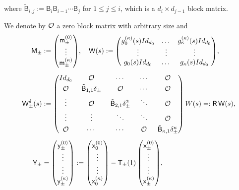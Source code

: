 \documentclass[10pt,a4paper]{amsart}
\theoremstyle{definition}
\newcommand{\sB}{{\mathsf B}}
\newcommand{\sW}{{\mathsf W}}
\newcommand{\I}{\textup{Id}}\let\Id\I
\begin{document}
where $\tilde \sB_{i,j} := \sB_i \sB_{i-1} \cdots \sB_j$ for
$1 \le j \le i$, which is a $d_i \times d_{j-1}$ block matrix.

We denote by ${\mathcal O}$ a zero block matrix with arbitrary size and
\begin{align}\label{eq:matrices}
\mathsf M_\pm &:=
\begin{pmatrix}
\mathsf m^{(0)}_\pm \\
\vdots \\
\mathsf m^{(\kappa)} _\pm
\end{pmatrix}\!, \quad
\sW(s) :=
\begin{pmatrix}
g_0^{(\kappa)}(s) \I_{d_0} & \dots & g_\kappa ^{(\kappa)} (s)
\I_{d_0} \\
\vdots & \vdots & \vdots \\
g_0(s) \I_{d_0} & \dots & g_\kappa(s) \I_{d_0}
\end{pmatrix}\!, \\[5pt]
\sW_\pm ^\delta(s) &:=\arraycolsep6.5pt
\begin{pmatrix}
\I_{d_0} & \OO & \cdots & \cdots & \OO \\[3pt]
\OO & \tilde \sB_{1,1} \delta_{\pm} & \OO & \cdots & \OO \\[3pt]
\vdots & \OO & \tilde\sB_{2,1} \delta_\pm ^2 & \ddots & \OO \\[3pt]
\vdots & \vdots & \ddots & \ddots & \OO \\[3pt]
\OO & \cdots & \cdots & \OO & \tilde \sB_{\kappa,1} \delta_\pm ^\kappa
\end{pmatrix}
W(s) =: \mathsf R \, \mathsf W(s),\\[5pt]
\mathsf Y_\pm &=
\begin{pmatrix}
\mathsf y^{(0)} _\pm \\
\vdots \\
\vdots \\
\mathsf y^{(\kappa)} _\pm
\end{pmatrix}
:= \begin{pmatrix}
\mathsf x_0 ^{(0)} \\
\vdots \\
\vdots \\
\mathsf x_0 ^{(\kappa)}
\end{pmatrix} - \mathsf T_\pm(1) \begin{pmatrix}
\mathsf x^{(0)} _\pm \\
\vdots \\
\vdots \\
\mathsf x^{(\kappa)} _\pm
\end{pmatrix}\!,
\end{align}\vspace*{-10pt}
\end{document}
